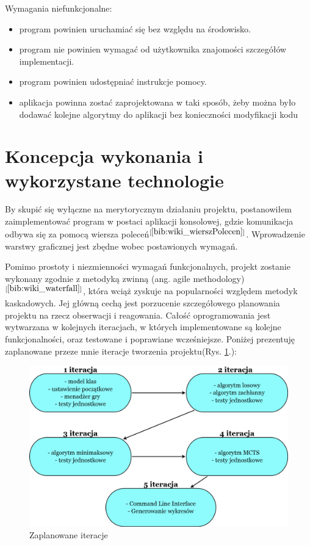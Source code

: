 Wymagania niefunkcjonalne:
\begin{itemize}
	\item program powinien uruchamiać się bez względu na środowisko.
	\item program nie powinien wymagać od użytkownika znajomości szczegółów implementacji.
	\item program powinien udostępniać instrukcje pomocy.
	\item aplikacja powinna zostać zaprojektowana w taki sposób, żeby można było dodawać kolejne algorytmy do aplikacji bez konieczności modyfikacji kodu
\end{itemize}
\section{Koncepcja wykonania i wykorzystane technologie}
By skupić się wyłączne na merytorycznym działaniu projektu, postanowiłem zaimplementować program w postaci aplikacji konsolowej, gdzie komunikacja odbywa się za pomocą wiersza poleceń$^{[\ref{bib:wiki_wierszPolecen}]}$. Wprowadzenie warstwy graficznej jest zbędne wobec postawionych wymagań.

Pomimo prostoty i niezmienności wymagań funkcjonalnych, projekt zostanie wykonany zgodnie z metodyką zwinną (ang. agile methodology)$^{[\ref{bib:wiki_waterfall}]}$, która wciąż zyskuje na popularności względem metodyk kaskadowych. Jej główną cechą jest porzucenie szczegółowego planowania projektu na rzecz obserwacji i reagowania. Całość oprogramowania jest wytwarzana w kolejnych iteracjach, w których implementowane są kolejne funkcjonalności, oraz testowane i poprawiane wcześniejsze. Poniżej prezentuję zaplanowane przeze mnie iteracje tworzenia projektu(Rys. \ref{fig:diagramIteracji}.):

\begin{figure}[H]
	\centering
	\includegraphics[width=\textwidth]{Resources/DiagramIteracji.png}
	\caption{Zaplanowane iteracje} 
	\label{fig:diagramIteracji}
\end{figure}

